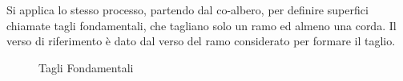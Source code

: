 \documentclass{article}
\numberwithin{equation}{subsection}
\begin{document}
Si applica lo stesso processo, partendo dal co-albero, per definire superfici chiamate tagli fondamentali, che tagliano solo un ramo ed almeno una corda. Il verso di 
riferimento è dato dal verso del ramo considerato per formare il taglio. 
\begin{figure}[H]%
    \centering
    \qquad
    \label{fig:tagli-fondamentali-1-2}
\end{figure}
\begin{figure}[H]%
    \centering
    \qquad
    \caption{Tagli Fondamentali}
    \label{fig:tagli-fondamentali-3-4}
\end{figure}
\end{document}
